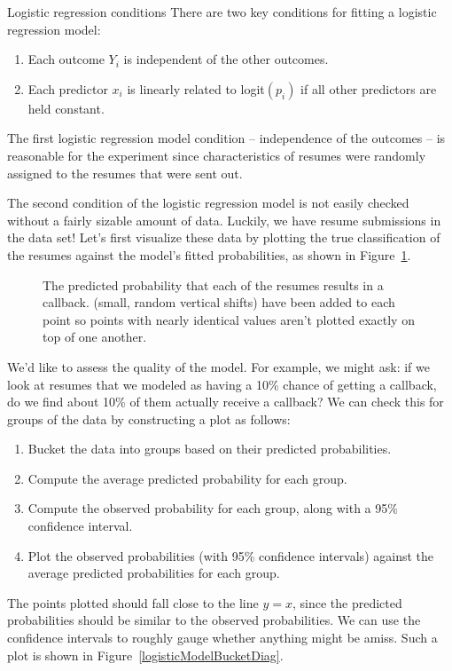 \begin{onebox}{Logistic regression conditions}
There are two key conditions for fitting a logistic regression model:\vspace{-1mm}
\begin{enumerate}
\setlength{\itemsep}{0mm}
\item
    Each outcome $Y_i$ is independent of the other outcomes.
\item
    Each predictor $x_i$ is linearly related to logit$(p_i)$
    if all other predictors are held constant.
\end{enumerate}
\end{onebox}

The first logistic regression model condition
-- independence of the outcomes --
is reasonable for the experiment since characteristics
of resumes were randomly assigned to the resumes that
were sent out.

The second condition of the logistic regression model is
not easily checked without a fairly sizable amount of data.
Luckily, we have \resN{} resume submissions in the data set!
Let's first visualize these data by plotting the true
classification of the resumes against the model's fitted
probabilities, as shown in
Figure~\ref{logisticModelPredict}.

\begin{figure}[h]
  \centering
  \caption{The predicted probability that each of the
      \resN{} resumes results in a callback.
      (small, random vertical shifts) have been added
      to each point so points with nearly identical
      values aren't plotted exactly on top of one another.}
  \label{logisticModelPredict}
\end{figure}

We'd like to assess the quality of the model.
For example, we might ask:
if we look at resumes that we modeled as having
a 10\% chance of getting a callback, do we find
about 10\% of them actually receive a callback?
We can check this for groups of the data by constructing
a plot as follows:
\begin{enumerate}
\item
    Bucket the data into groups based on their
    predicted probabilities.
\item
    Compute the average predicted probability for each group.
\item
    Compute the observed probability for each group,
    along with a 95\% confidence interval.
\item
    Plot the observed probabilities
    (with 95\% confidence intervals)
    against the average predicted probabilities for each group.
\end{enumerate}
The points plotted should fall close to the line $y = x$,
since the predicted probabilities should be similar to the
observed probabilities.
We can use the confidence intervals to roughly gauge whether
anything might be amiss.
Such a plot is shown in Figure~\ref{logisticModelBucketDiag}.


